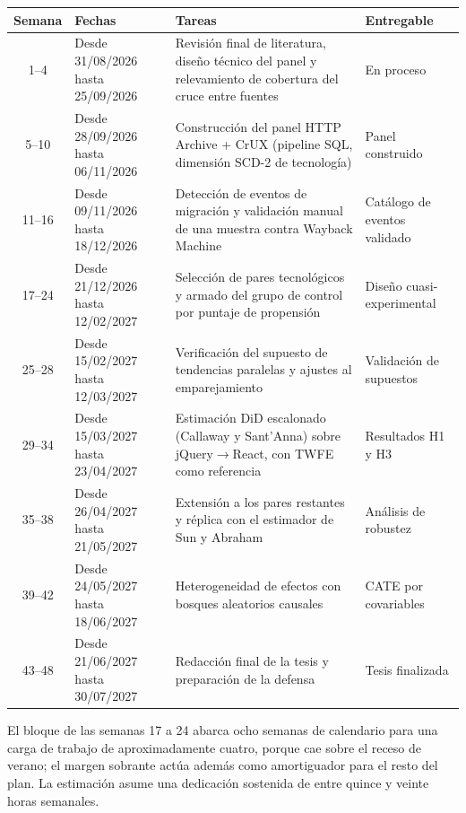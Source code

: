 \documentclass[12pt, a4paper]{article}
\begin{document}
\vspace{0.3cm}
\begin{center}
\small
\begin{tabular}{|c|p{3.2cm}|p{6.4cm}|p{3.2cm}|}
\hline
\textbf{Semana} & \textbf{Fechas} & \textbf{Tareas} & \textbf{Entregable} \\ \hline
1--4 & Desde 31/08/2026 hasta 25/09/2026 & Revisión final de literatura, diseño técnico del panel y relevamiento de cobertura del cruce entre fuentes & En proceso \\ \hline
5--10 & Desde 28/09/2026 hasta 06/11/2026 & Construcción del panel HTTP Archive + CrUX (pipeline SQL, dimensión SCD-2 de tecnología) & Panel construido \\ \hline
11--16 & Desde 09/11/2026 hasta 18/12/2026 & Detección de eventos de migración y validación manual de una muestra contra Wayback Machine & Catálogo de eventos validado \\ \hline
17--24 & Desde 21/12/2026 hasta 12/02/2027 & Selección de pares tecnológicos y armado del grupo de control por puntaje de propensión & Diseño cuasi-experimental \\ \hline
25--28 & Desde 15/02/2027 hasta 12/03/2027 & Verificación del supuesto de tendencias paralelas y ajustes al emparejamiento & Validación de supuestos \\ \hline
29--34 & Desde 15/03/2027 hasta 23/04/2027 & Estimación DiD escalonado (Callaway y Sant'Anna) sobre jQuery$\to$React, con TWFE como referencia & Resultados H1 y H3 \\ \hline
35--38 & Desde 26/04/2027 hasta 21/05/2027 & Extensión a los pares restantes y réplica con el estimador de Sun y Abraham & Análisis de robustez \\ \hline
39--42 & Desde 24/05/2027 hasta 18/06/2027 & Heterogeneidad de efectos con bosques aleatorios causales & CATE por covariables \\ \hline
43--48 & Desde 21/06/2027 hasta 30/07/2027 & Redacción final de la tesis y preparación de la defensa & Tesis finalizada \\ \hline
\end{tabular}
\end{center}

\vspace{0.2cm}
\noindent El bloque de las semanas 17 a 24 abarca ocho semanas de calendario para una carga de trabajo de aproximadamente cuatro, porque cae sobre el receso de verano; el margen sobrante actúa además como amortiguador para el resto del plan. La estimación asume una dedicación sostenida de entre quince y veinte horas semanales.
\end{document}
